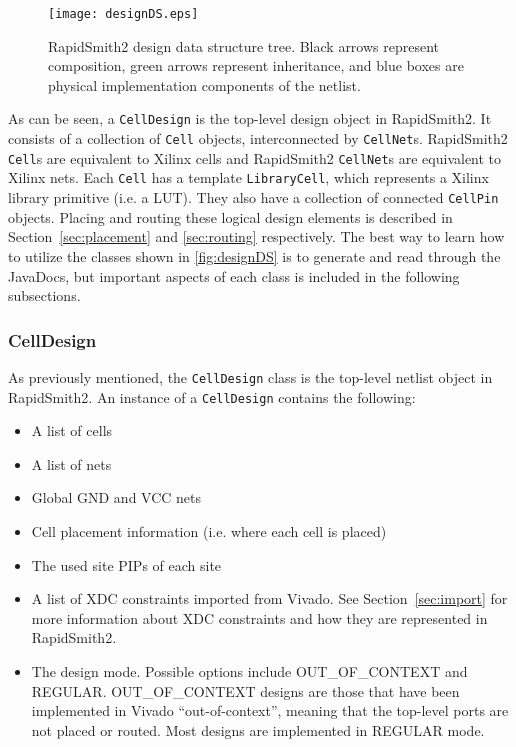 \begin{figure}[H]
 \centering
 \texttt{[image: designDS.eps]}
 \caption{RapidSmith2 design data structure tree. Black arrows represent
 composition, green arrows represent inheritance, and blue boxes are physical
 implementation components of the netlist.}
 \label{fig:designDS}
\end{figure}

As can be seen, a \texttt{CellDesign} is the top-level design object in
RapidSmith2. It consists of a collection of \texttt{Cell} objects,
interconnected by \texttt{CellNet}s. RapidSmith2 \texttt{Cell}s are equivalent
to Xilinx cells and RapidSmith2 \texttt{CellNet}s are equivalent to Xilinx nets.
Each \texttt{Cell} has a template \texttt{LibraryCell}, which represents
a Xilinx library primitive (i.e. a LUT). They also have a collection of
connected \texttt{CellPin} objects. Placing and routing these logical design
elements is described in Section~\ref{sec:placement} and \ref{sec:routing}
respectively. The best way to learn how to utilize the classes shown in
\autoref{fig:designDS} is to generate and read through the
JavaDocs, but important aspects of each class is included in the
following subsections.


\subsubsection{CellDesign} \label{sec:cellDesignDS}
As previously mentioned, the \texttt{CellDesign} class is the top-level netlist
object in RapidSmith2. An instance of a \texttt{CellDesign} contains the
following:

\begin{itemize}
  \item A list of cells
  \item A list of nets 
  \item Global GND and VCC nets
  \item Cell placement information (i.e. where each cell is placed)
  \item The used site PIPs of each site
  \item A list of XDC constraints imported from Vivado. See Section~\ref{sec:import}
  for more information about XDC constraints and how they are represented in
  RapidSmith2.
  \item The design mode. Possible options include OUT\_OF\_CONTEXT and REGULAR.
  OUT\_OF\_CONTEXT designs are those that have been implemented in Vivado
  ``out-of-context'', meaning that the top-level ports are not placed or routed.
  Most designs are implemented in REGULAR mode.
\end{itemize}

